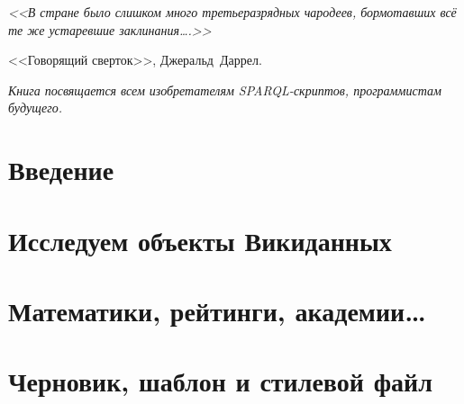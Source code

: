 \documentclass{tufte-book}
\theoremstyle{definition}
\begin{document}
\begin{doublespace}
\noindent\fontsize{18}{22}\selectfont\itshape
\nohyphenation
<<В стране было слишком много третьеразрядных чародеев, бормотавших всё те же устаревшие заклинания\dots.>>

<<Говорящий сверток>>, \mbox{Джеральд Даррел}.
\end{doublespace}
\vfill



\begin{doublespace}
\noindent\fontsize{18}{22}\selectfont\itshape
\nohyphenation
Книга посвящается всем изобретателям SPARQL-скриптов, 
    программистам будущего.
\end{doublespace}

\vfill


\cleardoublepage

\part{Введение}


\mainmatter

%
%

%
%
%


%


\part{Исследуем объекты Викиданных}











\part{Математики, рейтинги, академии\ldots}





\part{Черновик, шаблон и стилевой файл}
\end{document}
